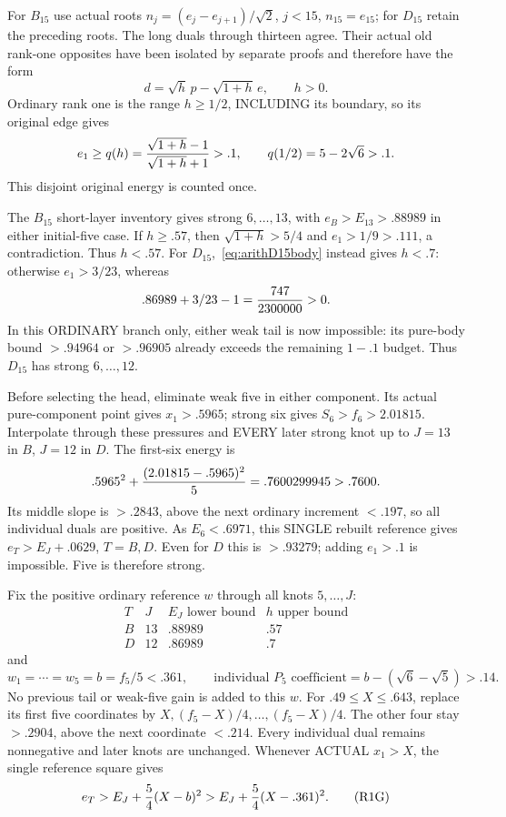 For \(B_{15}\) use actual roots
\(n_j=(e_j-e_{j+1})/\sqrt2\), \(j<15\), \(n_{15}=e_{15}\);
for \(D_{15}\) retain the preceding roots.
The long duals through thirteen agree.
Their actual old rank-one opposites have been isolated
by separate proofs and therefore have the form
\[
                d=\sqrt h\,p-\sqrt{1+h}\,e,\qquad h>0.
\]
Ordinary rank one is the range \(h\ge1/2\), INCLUDING
its boundary, so its original edge gives
\[
 e_1\ge q(h)={\sqrt{1+h}-1\over\sqrt{1+h}+1}>.1,
 \qquad q(1/2)=5-2\sqrt6>.1 .
\]
This disjoint original energy is counted once.

The \(B_{15}\) short-layer inventory gives strong
\(6,\ldots,13\), with \(e_B>E_{13}>.88989\)
in either initial-five case.
If \(h\ge.57\), then \(\sqrt{1+h}>5/4\)
and \(e_1>1/9>.111\), a contradiction.
Thus \(h<.57\).
For \(D_{15}\),~\eqref{eq:arithD15body} instead gives
\(h<.7\): otherwise \(e_1>3/23\), whereas
\[
                         .86989+3/23-1={747\over2300000}>0 .
\]
In this ORDINARY branch only, either weak tail is now
impossible: its pure-body bound \(>.94964\) or \(>.96905\)
already exceeds the remaining \(1-.1\) budget.
Thus \(D_{15}\) has strong \(6,\ldots,12\).

Before selecting the head, eliminate weak five in either
component.
Its actual pure-component point gives \(x_1>.5965\);
strong six gives \(S_6>f_6>2.01815\).
Interpolate through these pressures and EVERY later
strong knot up to \(J=13\) in \(B\), \(J=12\) in \(D\).
The first-six energy is
\[
 .5965^2+{(2.01815-.5965)^2\over5}
        =.7600299945>.7600 .
\]
Its middle slope is \(>.2843\), above the next ordinary
increment \(<.197\), so all individual duals are positive.
As \(E_6<.6971\), this SINGLE rebuilt reference gives
\(e_T>E_J+.0629\), \(T=B,D\).
Even for \(D\) this is \(>.93279\); adding \(e_1>.1\)
is impossible.
Five is therefore strong.

Fix the positive ordinary reference \(w\) through all
knots \(5,\ldots,J\):
\[
 \begin{array}{c|c|c|c}
 T&J&E_J\text{ lower bound}&h\text{ upper bound}\\ \hline
 B&13&.88989&.57\\
 D&12&.86989&.7
 \end{array}
\]
and
\[
 w_1=\cdots=w_5=b=f_5/5<.361,\qquad
 \text{individual }P_5\text{ coefficient}=
 b-(\sqrt6-\sqrt5)>.14 .
\]
No previous tail or weak-five gain is added to this \(w\).
For \(.49\le X\le.643\), replace its first five
coordinates by \(X,(f_5-X)/4,\ldots,(f_5-X)/4\).
The other four stay \(>.2904\), above the next
coordinate \(<.214\).
Every individual dual remains nonnegative and later
knots are unchanged.
Whenever ACTUAL \(x_1>X\), the single reference square gives
\[
                   e_T>E_J+{5\over4}(X-b)^2
                       >E_J+{5\over4}(X-.361)^2 .
\tag{R1G}\label{eq:arithBD15graft}
\]

